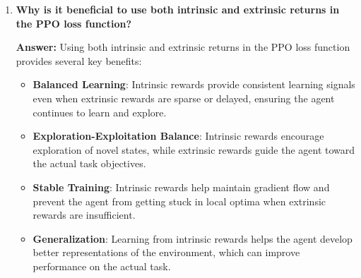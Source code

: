 \documentclass[12pt]{article}
\begin{document}
{{{\begin{itemize}[noitemsep]
\begin{enumerate}
\begin{itemize}
        \item \textbf{Exploration Incentive}: States with high prediction error are likely to be unexplored or contain new information. By rewarding the agent for visiting such states, RND encourages exploration of the state space.
        
        \item \textbf{Self-Supervised Learning}: The predictor network learns to minimize prediction error on frequently visited states, making it easier to identify truly novel states that haven't been encountered before.
        
        \item \textbf{Intrinsic Motivation}: The prediction error serves as an intrinsic reward that doesn't depend on external rewards, providing consistent exploration signals even in sparse reward environments.
    \end{itemize}
    
    The prediction error encourages better exploration because it creates a natural curriculum: the agent is motivated to visit states where it can learn something new (high prediction error) rather than states it already understands well (low prediction error).
    
    \item \textbf{Why is it beneficial to use both intrinsic and extrinsic returns in the PPO loss function?}
    
    \textbf{Answer:} Using both intrinsic and extrinsic returns in the PPO loss function provides several key benefits:
    
    \begin{itemize}
        \item \textbf{Balanced Learning}: Intrinsic rewards provide consistent learning signals even when extrinsic rewards are sparse or delayed, ensuring the agent continues to learn and explore.
        
        \item \textbf{Exploration-Exploitation Balance}: Intrinsic rewards encourage exploration of novel states, while extrinsic rewards guide the agent toward the actual task objectives.
        
        \item \textbf{Stable Training}: Intrinsic rewards help maintain gradient flow and prevent the agent from getting stuck in local optima when extrinsic rewards are insufficient.
        
        \item \textbf{Generalization}: Learning from intrinsic rewards helps the agent develop better representations of the environment, which can improve performance on the actual task.
        

\end{itemize}
\end{enumerate}
\end{itemize}}}}
\end{document}
